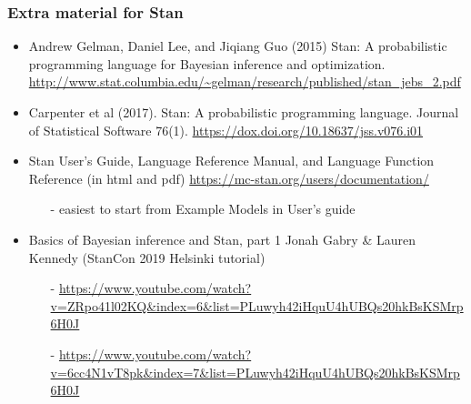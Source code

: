 \documentclass[10pt]{beamer}
\begin{document}
\begin{frame}

\frametitle{Extra material for Stan}

  \begin{itemize}
  \item Andrew Gelman, Daniel Lee, and Jiqiang Guo (2015) Stan: A
    probabilistic programming language for Bayesian inference and
    optimization. \url{http://www.stat.columbia.edu/~gelman/research/published/stan_jebs_2.pdf}
  \item Carpenter et al (2017). Stan: A probabilistic programming
    language. Journal of Statistical Software
    76(1). \url{https://dox.doi.org/10.18637/jss.v076.i01}
  \item Stan User's Guide, Language Reference Manual, and Language
    Function Reference (in html and pdf)
    \url{https://mc-stan.org/users/documentation/}
    \begin{itemize}
    \item[-] easiest to start from Example Models in User's guide
    \end{itemize}
  \item Basics of Bayesian inference and Stan, part 1 Jonah Gabry \&
    Lauren Kennedy (StanCon 2019 Helsinki tutorial)
    \begin{itemize}
    \item[-]
      \url{https://www.youtube.com/watch?v=ZRpo41l02KQ&index=6&list=PLuwyh42iHquU4hUBQs20hkBsKSMrp6H0J}
    \item[-] \url{https://www.youtube.com/watch?v=6cc4N1vT8pk&index=7&list=PLuwyh42iHquU4hUBQs20hkBsKSMrp6H0J}
  \end{itemize}
  \end{itemize}
\end{frame}



\end{document}
